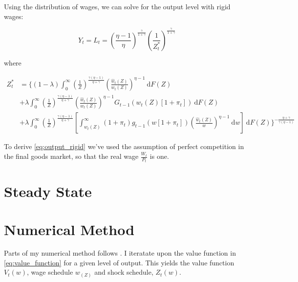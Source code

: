 \documentclass[12pt,a4paper]{scrartcl}            %
\begin{document}
Using the distribution of wages, we can solve for the output level with rigid wages:

\begin{equation}
    \label{eq:output_rigid}
    Y_t = L_t = \left(\frac{\eta - 1}{\eta} \right)^{\frac{\gamma}{1 + \gamma}}\left( \frac{1}{Z_t^*} \right)^{\frac{\gamma}{1 + \gamma}}
\end{equation}

where

\begin{equation}
    \label{eq:z_star}
    \begin{split}
    Z_t^* &= \Big\{(1 - \lambda) \int_{0}^{\infty} \! \left( \frac{1}{Z} \right)^{\frac{\gamma(\eta - 1)}{\eta + \gamma}} \left( \frac{\hat{w}_t(Z)}{w_t(Z)} \right)^{\eta - 1}\ \mathrm{d}F(Z) \\
          &+            \lambda  \int_{0}^{\infty} \! \left( \frac{1}{Z} \right)^{\frac{\gamma(\eta - 1)}{\eta + \gamma}} \left( \frac{\hat{w}_t(Z)}{w_t(Z)} \right)^{\eta - 1} G_{t-1}\left( w_t(Z)[1 + \pi_t] \right)                                                     \ \mathrm{d}F(Z)\\
          &+            \lambda  \int_{0}^{\infty} \! \left( \frac{1}{Z} \right)^{\frac{\gamma(\eta - 1)}{\eta + \gamma}} \left[ \int_{w_t(Z)}^{\infty} (1 + \pi_t)g_{t-1}\left( w[1 + \pi_t] \right) \left( \frac{\hat{w}_t(Z)}{w} \right)^{\eta - 1}\ \mathrm{d}w \right] \ \mathrm{d}F(Z)
            \Big\}^{-\frac{\eta + \gamma}{\gamma(\eta - 1)}}
    \end{split}
\end{equation}

To derive \ref{eq:output_rigid} we've used the assumption of perfect competition in the final goods market, so that the real wage $\frac{W_t}{P_t}$ is one.


\section{Steady State}
\label{sec:steady_state}

\newpage



\newpage
\appendix

\section{Numerical Method}

Parts of my numerical method follows \cite{daly_hobijn_2013}.
I iteratate upon the value function in \ref{eq:value_function} for a given level of output.
This yields the value function $V_t(w)$, wage schedule $w_(Z)$ and shock schedule, $Z_t(w)$.
\end{document}
